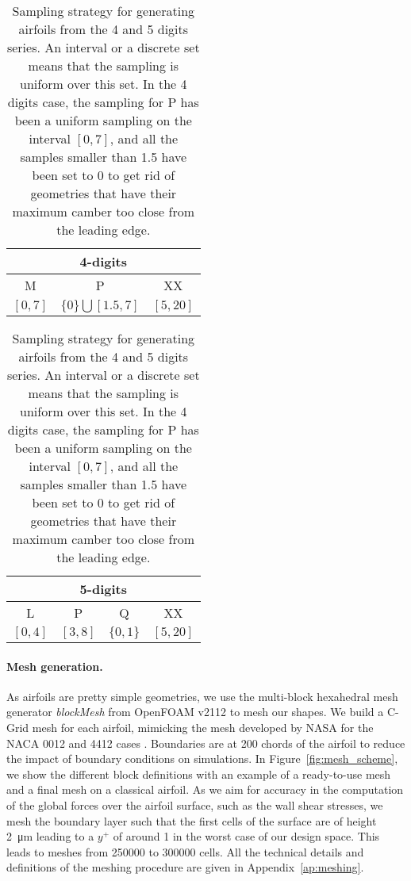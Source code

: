 \begin{table}
	\caption{Sampling strategy for generating airfoils from the 4 and 5 digits series. An interval or a discrete set means that the sampling is uniform over this set. In the 4 digits case, the sampling for P has been a uniform sampling on the interval $[0, 7]$, and all the samples smaller than 1.5 have been set to 0 to get rid of geometries that have their maximum camber too close from the leading edge.}
	\label{tab:sample-NACA}
	\centering
	\begin{tabular}{ccc}
		\toprule
		\multicolumn{3}{c}{4-digits}                  \\
		\midrule
		M & P & XX \\
		\midrule
		$[0, 7]$ & $\{0\}\bigcup [1.5, 7]$ & $[5, 20]$      \\
		\bottomrule
	\end{tabular} \hspace{1cm}
	\begin{tabular}{cccc}
		\toprule
		\multicolumn{4}{c}{5-digits}                    \\
		\midrule
		L & P & Q & XX \\
		\midrule
		$[0, 4]$ & $[3, 8]$ & $\{0, 1\}$ & $[5, 20]$      \\
		\bottomrule
	\end{tabular}
\end{table}

\paragraph{Mesh generation.} As airfoils are pretty simple geometries, we use the multi-block hexahedral mesh generator \emph{blockMesh} from OpenFOAM v2112 \cite{OpenFOAM} to mesh our shapes. We build a C-Grid mesh for each airfoil, mimicking the mesh developed by NASA for the NACA 0012 and 4412 cases \cite{TMR}. Boundaries are at 200 chords of the airfoil to reduce the impact of boundary conditions on simulations. In Figure~\ref{fig:mesh_scheme}, we show the different block definitions with an example of a ready-to-use mesh and a final mesh on a classical airfoil. As we aim for accuracy in the computation of the global forces over the airfoil surface, such as the wall shear stresses, we mesh the boundary layer such that the first cells of the surface are of height \SI{2}{\micro\meter} leading to a $y^{+}$ of around 1 in the worst case of our design space. This leads to meshes from \SI{250000}{} to \SI{300000}{} cells. All the technical details and definitions of the meshing procedure are given in Appendix~\ref{ap:meshing}.

